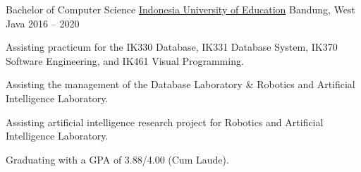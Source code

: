 


\begin{cventries}


\cventry
{Bachelor of Computer Science} %
{\href{https://www.upi.edu/}{Indonesia University of Education}} %
{Bandung, West Java} %
{2016 -- 2020} %
{ %
\begin{cvitems}
\item {Assisting practicum for the IK330 Database, IK331 Database System, IK370 Software Engineering, and IK461 Visual Programming.}
\item {Assisting the management of the Database Laboratory \& Robotics and Artificial Intelligence Laboratory.}
\item {Assisting artificial intelligence research project for Robotics and Artificial Intelligence Laboratory.}
\item {Graduating with a GPA of 3.88/4.00 (Cum Laude).}
\end{cvitems}
}


\end{cventries}
